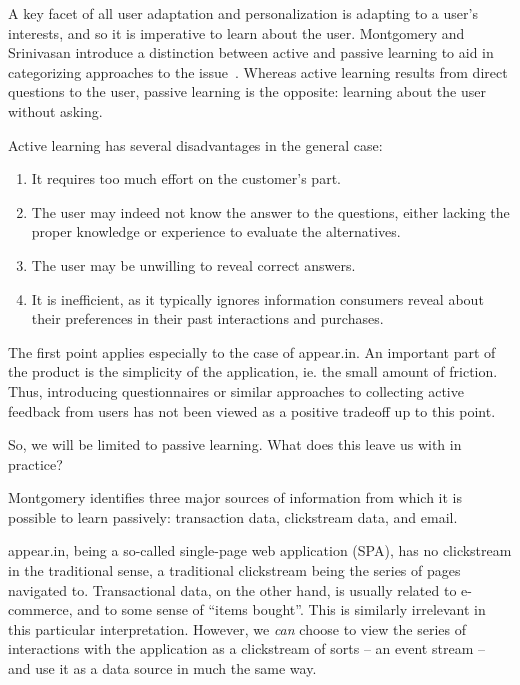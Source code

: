     A key facet of all user adaptation and personalization is adapting to a user's interests, and so it is imperative to learn about the user. Montgomery and Srinivasan introduce a distinction between active and passive learning to aid in categorizing approaches to the issue~\cite{Montgomery2002}. Whereas active learning results from direct questions to the user, passive learning is the opposite: learning about the user without asking.

    Active learning has several disadvantages in the general case:

    \begin{enumerate}
      \item It requires too much effort on the customer's part.
      \item The user may indeed not know the answer to the questions, either lacking the proper knowledge or experience to evaluate the alternatives.
      \item The user may be unwilling to reveal correct answers.
      \item It is inefficient, as it typically ignores information consumers reveal about their preferences in their past interactions and purchases.
    \end{enumerate}

    The first point applies especially to the case of appear.in. An important part of the product is the simplicity of the application, ie. the small amount of friction. Thus, introducing questionnaires or similar approaches to collecting active feedback from users has not been viewed as a positive tradeoff up to this point.

    So, we will be limited to passive learning. What does this leave us with in practice?

    Montgomery identifies three major sources of information from which it is possible to learn passively: transaction data, clickstream data, and email.

    appear.in, being a so-called single-page web application (SPA), has no clickstream in the traditional sense, a traditional clickstream being the series of pages navigated to. Transactional data, on the other hand, is usually related to e-commerce, and to some sense of ``items bought''. This is similarly irrelevant in this particular interpretation. However, we \emph{can} choose to view the series of interactions with the application as a clickstream of sorts -- an event stream -- and use it as a data source in much the same way.

